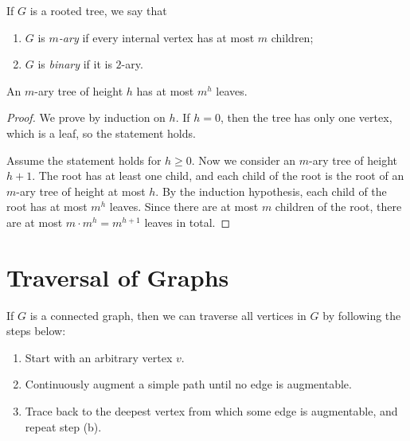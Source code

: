 \begin{definition}
    If $G$ is a rooted tree, we say that 
    \begin{enumerate}[itemindent=0ex, itemsep=0pt, label=\upshape{(\alph*)}]
        \item $G$ is \emph{$m$-ary} if every internal vertex has at most $m$ children;
        \item $G$ is \emph{binary} if it is $2$-ary.
    \end{enumerate}
\end{definition}

\begin{theorem}
    An $m$-ary tree of height $h$ has at most $m^h$ leaves. 
\end{theorem}

\begin{proof}
    We prove by induction on $h$. If $h=0$, then the tree has only one vertex, which is a leaf, so the statement holds. 

    Assume the statement holds for $h\geq 0$. Now we consider an $m$-ary tree of height $h+1$. The root has at least one child, and each child of the root is the root of an $m$-ary tree of height at most $h$. By the induction hypothesis, each child of the root has at most $m^h$ leaves. Since there are at most $m$ children of the root, there are at most $m\cdot m^h=m^{h+1}$ leaves in total.
\end{proof}

\section{Traversal of Graphs}
\begin{algo}
    If $G$ is a connected graph, then we can traverse all vertices in $G$ by following the steps below:
    \begin{enumerate}[itemindent=0ex, itemsep=0pt, label=\upshape{(\alph*)}]
        \item Start with an arbitrary vertex $v$.
        \item Continuously augment a simple path until no edge is augmentable. 
        \item Trace back to the deepest vertex from which some edge is augmentable, and repeat step \textup{(b)}.
    \end{enumerate}
\end{algo}

